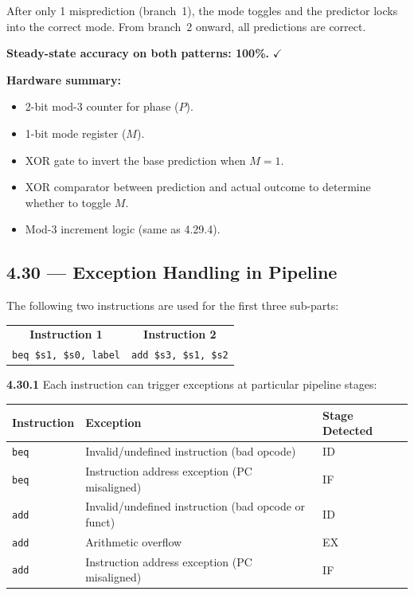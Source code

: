 After only 1 misprediction (branch~1), the mode toggles and the predictor
locks into the correct mode. From branch~2 onward, all predictions are
correct.

\textbf{Steady-state accuracy on both patterns: 100\%.} $\checkmark$

\textbf{Hardware summary:}
\begin{itemize}
  \item 2-bit mod-3 counter for phase ($P$).
  \item 1-bit mode register ($M$).
  \item XOR gate to invert the base prediction when $M = 1$.
  \item XOR comparator between prediction and actual outcome to determine
    whether to toggle $M$.
  \item Mod-3 increment logic (same as 4.29.4).
\end{itemize}
\subsection*{4.30 --- Exception Handling in Pipeline}
\hypertarget{sol-4.30}{}

The following two instructions are used for the first three sub-parts:

\begin{center}
\begin{tabular}{cc}
\textbf{Instruction 1} & \textbf{Instruction 2} \\
\texttt{beq \$s1, \$s0, label} & \texttt{add \$s3, \$s1, \$s2}
\end{tabular}
\end{center}

\medskip\noindent\textbf{4.30.1}
Each instruction can trigger exceptions at particular pipeline stages:

\begin{center}
\begin{tabular}{lll}
\toprule
\textbf{Instruction} & \textbf{Exception} & \textbf{Stage Detected} \\
\midrule
\texttt{beq} & Invalid/undefined instruction (bad opcode) & ID \\
\texttt{beq} & Instruction address exception (PC misaligned) & IF \\
\midrule
\texttt{add} & Invalid/undefined instruction (bad opcode or funct) & ID \\
\texttt{add} & Arithmetic overflow & EX \\
\texttt{add} & Instruction address exception (PC misaligned) & IF \\
\bottomrule
\end{tabular}
\end{center}

